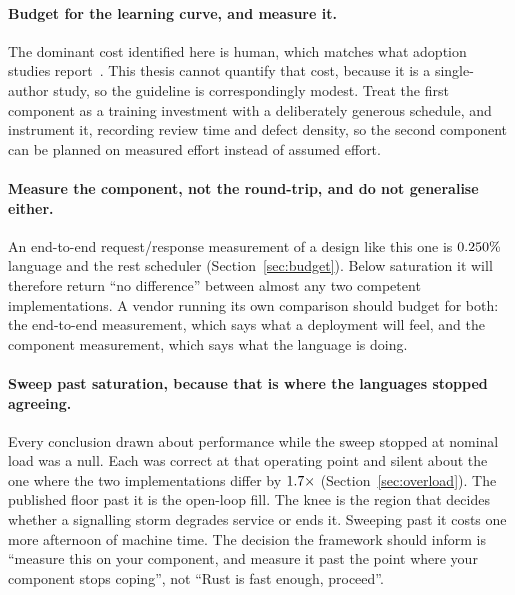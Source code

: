 \documentclass[english,oneside,a4paper,censored,csm,software-track-2020]{HYthesisML}
\begin{document}
\begin{appendices}
\paragraph{Budget for the learning curve, and measure it.}
The dominant cost identified here is human, which matches what adoption studies
report~\cite{fulton2021adopting}. This thesis cannot quantify that cost, because it is a
single-author study, so the guideline is correspondingly modest. Treat the first component as a
training investment with a deliberately generous schedule, and instrument it, recording review
time and defect density, so the second component can be planned on measured effort instead of
assumed effort.

\paragraph{Measure the component, not the round-trip, and do not generalise either.}
An end-to-end request/response measurement of a design like this one is
$0.250\%$ language and the rest scheduler (Section~\ref{sec:budget}). Below
saturation it will therefore return ``no difference'' between almost any two competent
implementations. A vendor running its own comparison should budget for both: the end-to-end
measurement, which says what a deployment will feel, and the component measurement, which says
what the language is doing.

\paragraph{Sweep past saturation, because that is where the languages stopped agreeing.}
Every conclusion drawn about performance while the sweep stopped at nominal load was a null.
Each was correct at that operating point and silent about the one where the two implementations
differ by $1.7\times$ (Section~\ref{sec:overload}). The published floor past it is the open-loop fill. The knee is the region that
decides whether a signalling storm degrades service or ends it. Sweeping past it costs one more
afternoon of machine time. The decision the framework should inform is ``measure this on your
component, and measure it past the point where your component stops coping'', not ``Rust is fast
enough, proceed''.

\end{appendices}

\clearpage
\end{document}
